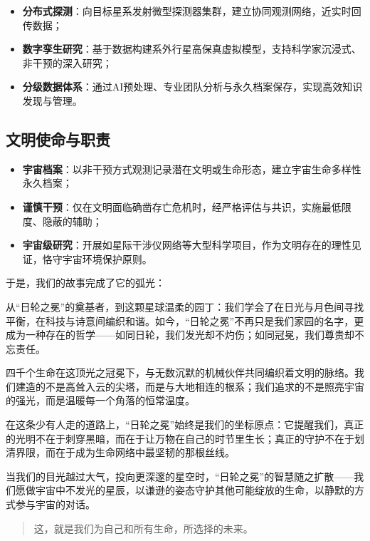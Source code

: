 \begin{itemize}
\item
  \textbf{分布式探测}：向目标星系发射微型探测器集群，建立协同观测网络，近实时回传数据；
\item
  \textbf{数字孪生研究}：基于数据构建系外行星高保真虚拟模型，支持科学家沉浸式、非干预的深入研究；
\item
  \textbf{分级数据体系}：通过AI预处理、专业团队分析与永久档案保存，实现高效知识发现与管理。
\end{itemize}

\subsection{文明使命与职责}\label{ux6587ux660eux4f7fux547dux4e0eux804cux8d23}

\begin{itemize}
\tightlist
\item
  \textbf{宇宙档案}：以非干预方式观测记录潜在文明或生命形态，建立宇宙生命多样性永久档案；
\item
  \textbf{谨慎干预}：仅在文明面临确凿存亡危机时，经严格评估与共识，实施最低限度、隐蔽的辅助；
\item
  \textbf{宇宙级研究}：开展如星际干涉仪网络等大型科学项目，作为文明存在的理性见证，恪守宇宙环境保护原则。
\end{itemize}

于是，我们的故事完成了它的弧光：

从``日轮之冕''的奠基者，到这颗星球温柔的园丁：我们学会了在日光与月色间寻找平衡，在科技与诗意间编织和谐。如今，``日轮之冕''不再只是我们家园的名字，更成为一种存在的哲学------如同日轮，我们发光却不灼伤；如同冠冕，我们尊贵却不忘责任。

四千个生命在这顶光之冠冕下，与无数沉默的机械伙伴共同编织着文明的脉络。我们建造的不是高耸入云的尖塔，而是与大地相连的根系；我们追求的不是照亮宇宙的强光，而是温暖每一个角落的恒常温度。

在这条少有人走的道路上，``日轮之冕''始终是我们的坐标原点：它提醒我们，真正的光明不在于刺穿黑暗，而在于让万物在自己的时节里生长；真正的守护不在于划清界限，而在于成为生命网络中最坚韧的那根丝线。

当我们的目光越过大气，投向更深邃的星空时，``日轮之冕''的智慧随之扩散------我们愿做宇宙中不发光的星辰，以谦逊的姿态守护其他可能绽放的生命，以静默的方式参与宇宙的对话。

\begin{quote}
这，就是我们为自己和所有生命，所选择的未来。

\end{quote}
